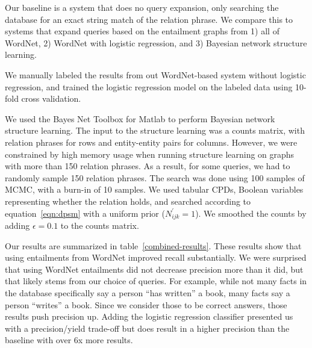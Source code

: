\documentclass{article}
\begin{document}
Our baseline is a system that does no query expansion, only searching the database for an exact string match of the relation phrase. We compare this to systems that expand queries based on the entailment graphs from 1) all of WordNet, 2) WordNet with logistic regression, and 3) Bayesian network structure learning.

We manually labeled the results from out WordNet-based system without logistic regression, and trained the logistic regression model on the labeled data using 10-fold cross validation.

We used the Bayes Net Toolbox for Matlab \cite{murphy2001bayes} to perform Bayesian network structure learning. The input to the structure learning was a counts matrix, with relation phrases for rows and entity-entity pairs for columns. However, we were constrained by high memory usage when running structure learning on graphs with more than 150 relation phrases. As a result, for some queries, we had to randomly sample 150 relation phrases. The search was done using 100 samples of MCMC, with a burn-in of 10 samples. We used tabular CPDs, Boolean variables representing whether the relation holds, and searched according to equation~\ref{eqn:dpsm} with a uniform prior ($N^\prime_{ijk} = 1$). We smoothed the counts by adding $\epsilon = 0.1$ to the counts matrix. 




Our results are summarized in table~\ref{combined-results}. These results show that using entailments from WordNet improved recall substantially. We were surprised that using WordNet entailments did not decrease precision more than it did, but that likely stems from our choice of queries. For example, while not many facts in the database specifically say a person ``has written'' a book, many facts say a person ``writes'' a book. Since we consider those to be correct answers, those results push precision up. Adding the logistic regression classifier presented us with a precision/yield trade-off but does result in a higher precision than the baseline with over 6x more results.
\end{document}
